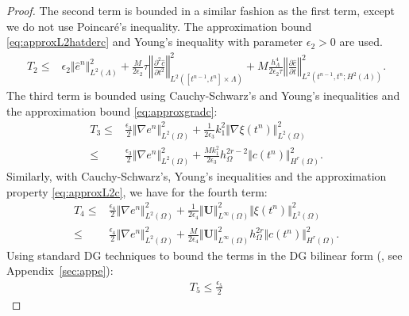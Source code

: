 \documentclass[pdflatex,sn-mathphys-num]{sn-jnl}%
\newcommand{\bfU}{{\boldsymbol U}}
\theoremstyle{thmstyleone}%
\theoremstyle{thmstyletwo}%
\theoremstyle{thmstylethree}%
\begin{document}
\begin{proof}
%
The second term is bounded in a similar fashion as the first term, except we do not use Poincar\'e's inequality. The approximation bound \eqref{eq:approxL2hatderc} and Young's inequality with parameter $\epsilon_2>0$ are used.
\begin{align*}
T_2 %
\leq & \epsilon_2 \Vert \hat e^n \Vert_{L^2(\Lambda)}^2
+ \frac{M}{2 \epsilon_2} \tau \left\Vert \frac{\partial^2 \hat c}{\partial t^2}\right\Vert_{L^2([t^{n-1},t^n]\times \Lambda)}^2
+ M \frac{h_\Lambda^{4}}{2\epsilon_2 \tau} \left\Vert \frac{\partial \hat c}{\partial t}\right\Vert_{L^2(t^{n-1},t^n;H^2(\Lambda))}^2.
\end{align*}
The third term is bounded using Cauchy-Schwarz's and
Young's inequalities and the approximation bound \eqref{eq:approxgradc}:
\begin{align*}
T_3 %
\leq & \frac{\epsilon_3}{2} \Vert \nabla e^n \Vert_{L^2(\Omega)}^2
+ \frac{1}{2 \epsilon_3} k_1^2 \Vert \nabla \xi(t^n)\Vert_{L^2(\Omega)}^2\\
\leq & \frac{\epsilon_3}{2} \Vert \nabla e^n \Vert_{L^2(\Omega)}^2
+ \frac{M k_1^2}{2 \epsilon_3} h_\Omega^{2r-2} \Vert c(t^n)\Vert_{H^r(\Omega)}^2. 
\end{align*}
Similarly, with Cauchy-Schwarz's, Young's inequalities and the approximation property \eqref{eq:approxL2c}, we have for the fourth term:
\begin{align*}
T_4 %
\leq & \frac{\epsilon_4}{2} \Vert \nabla e^n \Vert_{L^2(\Omega)}^2
+ \frac{1}{2 \epsilon_4} \Vert \bfU\Vert_{L^\infty(\Omega)}^2 \Vert \xi(t^n) \Vert_{L^2(\Omega)}^2\\
\leq & \frac{\epsilon_4}{2} \Vert \nabla e^n \Vert_{L^2(\Omega)}^2
+ \frac{M}{2 \epsilon_4} \Vert \bfU\Vert_{L^\infty(\Omega)}^2
h_\Omega^{2r}  \Vert c(t^n)\Vert_{H^r(\Omega)}^2. 
\end{align*}
Using standard DG techniques to bound the terms in the DG bilinear form (\cite{riviere2008discontinuous}, see Appendix~\ref{sec:appe}):
\begin{align*}
T_5 %
\leq  \frac{\epsilon_5}{2} 

\end{align*}
\end{proof}
\end{document}
